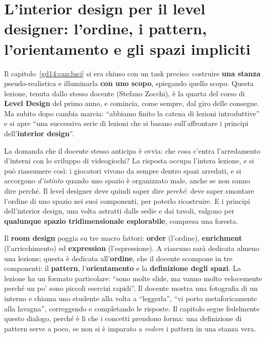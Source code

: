 \chapter[Interior design: l'ordine]{L'interior design per il level
designer: l'ordine, i pattern, l'orientamento e gli spazi impliciti}
\label{gd17:cap:ordine}

Il capitolo~\ref{gd14:cap:luci} si era chiuso con un task preciso: costruire
\textbf{una stanza} pseudo-realistica e illuminarla \textbf{con uno scopo},
spiegando quello scopo. Questa lezione, tenuta dallo stesso docente (Stefano
Zocchi), è la quarta del corso di \textbf{Level Design} del primo anno, e
comincia, come sempre, dal giro delle consegne. Ma subito dopo cambia marcia: ``abbiamo
finito la catena di lezioni introduttive'' e si apre ``una successiva serie di
lezioni che si basano sull'affrontare i principi dell'\textbf{interior design}''.

La domanda che il docente stesso anticipa è ovvia: che cosa c'entra l'arredamento
d'interni con lo sviluppo di videogiochi? La risposta occupa l'intera lezione, e si
può riassumere così: i giocatori vivono da sempre dentro spazi arredati, e si
accorgono \emph{d'istinto} quando uno spazio è organizzato male, anche se non sanno
dire perché. Il level designer deve quindi saper dire \emph{perché}: deve saper
smontare l'ordine di uno spazio nei suoi componenti, per poterlo ricostruire. E i
principi dell'interior design, una volta astratti dalle sedie e dai tavoli, valgono
per \textbf{qualunque spazio tridimensionale esplorabile}, compresa una foresta.

Il \textbf{room design} poggia su tre macro fattori: \textbf{order} (l'ordine),
\textbf{enrichment} (l'arricchimento) ed \textbf{expression} (l'espressione). A
ciascuno sarà dedicata almeno una lezione; questa è dedicata all'\textbf{ordine}, che
il docente scompone in tre componenti: il \textbf{pattern}, l'\textbf{orientamento} e
la \textbf{definizione degli spazi}. La lezione ha un formato particolare: ``sono
molte slide, ma vanno molto velocemente perché un po' sono piccoli esercizi
rapidi''. Il docente mostra una fotografia di un interno e chiama uno studente alla
volta a ``leggerla'', ``vi porto metaforicamente alla lavagna'', correggendo e
completando le risposte. Il capitolo segue fedelmente questo dialogo, perché è lì che
i concetti prendono forma: una definizione di pattern serve a poco, se non si è
imparato a \emph{vedere} i pattern in una stanza vera.

